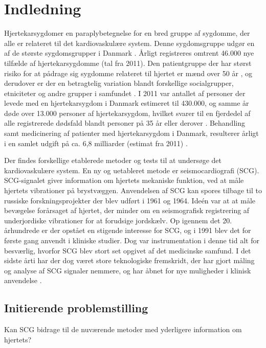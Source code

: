 \chapter{Indledning} \label{Indledning}

\textquotedbl Hjertekarsygdom\textquotedbl er en paraplybetegnelse for en bred gruppe af sygdomme, der alle er relateret til det kardiovaskulære system. Denne sygdomsgruppe udgør en af de største sygdomsgrupper i Danmark \cite{livet}. Årligt registreres omtrent 46.000 nye tilfælde af hjertekarsygdomme (tal fra 2011). Den patientgruppe der har størst risiko for at pådrage sig sygdomme relateret til hjertet er mænd over 50 år \cite{2011}, og derudover er der en betragtelig variation blandt forskellige socialgrupper, etniciteter og andre grupper i samfundet \cite{hjerteforening}. I 2011 var antallet af personer der levede med en hjertekarsygdom i Danmark estimeret til 430.000, og samme år døde over 13.000 personer af hjertekarsygdom, hvilket svarer til en fjerdedel af alle registrerede dødsfald blandt personer på 35 år eller derover \cite{2011}. Behandling samt medicinering af patienter med hjertekarsygdom i Danmark, resulterer årligt i en samlet udgift på ca. 6,8 milliarder (estimat fra 2011) \cite{hjerteforening}. 

Der findes forskellige etablerede metoder og tests til at undersøge det kardiovaskulære system. En ny og uetableret metode er seismocardiografi (SCG). SCG-signalet giver information om hjertets mekaniske funktion, ved at måle hjertets vibrationer på brystvæggen. Anvendelsen af SCG kan spores tilbage til to russiske forskningsprojekter der blev udført  i 1961 og 1964. Ideén var at at måle bevægelse forårsaget af hjertet, der minder om en seismografisk registrering af underjordiske vibrationer for at forudsige jordskælv. Op igennem det 20. århundrede er der opstået en stigende interesse for SCG, og i 1991 blev det for første gang anvendt i kliniske studier. Dog var instrumentation i denne tid alt for besværlig, hvorfor SCG blev stort set opgivet af det medicinske samfund. I det sidste årti har der dog været store teknologiske fremskridt, der har gjort måling og analyse af SCG signaler nemmere, og har åbnet for nye muligheder i klinisk anvendelse \cite{onan} \cite{zanetti}.

\section{Initierende problemstilling} Kan SCG bidrage til de nuværende metoder med yderligere information om hjertets?